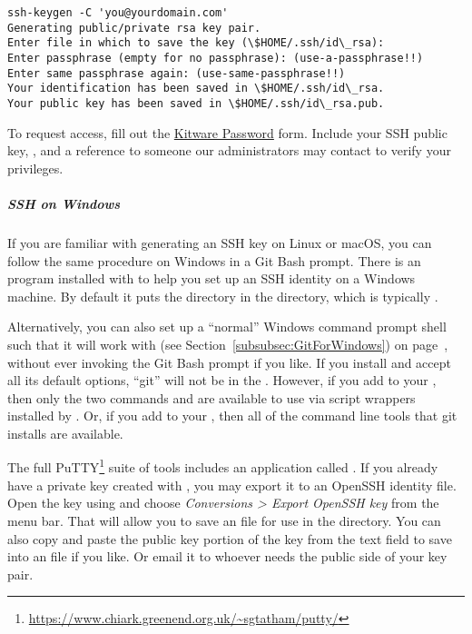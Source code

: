 \begin{verbatim}
ssh-keygen -C 'you@yourdomain.com'
Generating public/private rsa key pair.
Enter file in which to save the key (\$HOME/.ssh/id\_rsa):
Enter passphrase (empty for no passphrase): (use-a-passphrase!!)
Enter same passphrase again: (use-same-passphrase!!)
Your identification has been saved in \$HOME/.ssh/id\_rsa.
Your public key has been saved in \$HOME/.ssh/id\_rsa.pub.
\end{verbatim}

To request access, fill out the
\href{https://www.kitware.com/Admin/SendPassword.cgi}{Kitware Password} form.
Include your SSH public key, , and a reference to someone our
administrators may contact to verify your privileges.

\subparagraph{SSH on Windows}
\label{subpar:SSHOnWindows}

If you are familiar with generating an SSH key on Linux or macOS, you can follow
the same procedure on Windows in a Git Bash prompt. There is an
 program installed with  to help you set
up an SSH identity on a Windows machine. By default it puts the 
directory in the  directory, which is typically
.

Alternatively, you can also set up a ``normal'' Windows command prompt shell
such that it will work with  (see
Section~\ref{subsubsec:GitForWindows}) on page~\pageref{subsubsec:GitForWindows},
without ever invoking the Git Bash prompt if you like. If you install
 and accept all its default options, ``git'' will not be
in the . However, if you add  to
your , then only the two commands  and  are
available to use via  script wrappers installed by
. Or, if you add 
to your , then all of the command line tools that git installs are
available.

The full
{PuTTY}\footnote{\url{https://www.chiark.greenend.org.uk/~sgtatham/putty/}}
suite of tools includes an application called . If you
already have a private key created with , you may export it to an
OpenSSH identity file. Open the key using  and choose
\textit{Conversions > Export OpenSSH key} from the menu bar. That will allow you
to save an  file for use in the  directory. You can also
copy and paste the public key portion of the key from the  text
field to save into an  file if you like. Or email it to whoever
needs the public side of your key pair.

